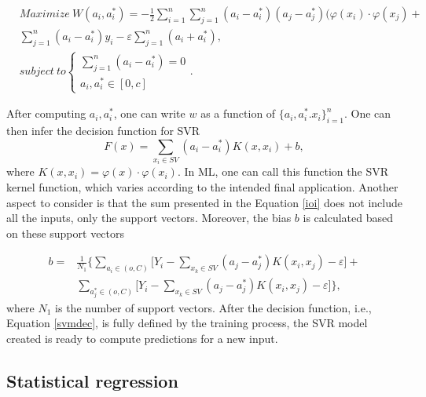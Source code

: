 \begin{equation}
\begin{split}
       & Maximize \  W(a_i, a_i^*) = -\frac{1}{2}\sum_{i=1}^{n}\sum_{j=1}^{n}(a_i-a_i^*)(a_j-a_j^*)(\varphi(x_i)\cdot \varphi(x_j) + \\
       & \sum_{j=1}^{n}(a_i-a_i^*)y_i - \varepsilon \sum_{j=1}^{n}(a_i+a_i^*),\\
       & subject \  to \begin{cases} \sum_{j=1}^{n}(a_i-a_i^*) = 0 \\ a_i, a_i^* \in [0,c] \end{cases} .
\end{split}
\end{equation}

After computing $a_i, a_i^*$, one can write $w$ as a function of $\{ a_i, a_i^*. x_i\}_{i=1}^n$. One can then infer the decision function for \ac{SVR}
\begin{equation}
      F(x) = \sum_{x_i \in SV} (a_i-a_i^*)K(x, x_i)+b , 
      \label{ioi}
\end{equation}
 where $K(x, x_i) = \varphi(x)\cdot\varphi(x_i)$. In \ac{ML}, one can call this function the \ac{SVR} kernel function, which varies according to the intended final application. Another aspect to consider is that the sum presented in the Equation \ref{ioi} does not include all the inputs, only the support vectors. Moreover, the bias $b$ is calculated based on these support vectors

\begin{equation}
\begin{split}
       b = & \frac{1}{N_1} \Bigg\{ \sum_{a_i \in (o,C)} \Bigg[ Y_i-\sum_{x_k\in SV}(a_j-a_j^*)K(x_i, x_j) - \varepsilon \Bigg] + \\
           & \sum_{a^*_j \in (o,C)}\Bigg[Y_i-\sum_{x_k\in SV}(a_j-a_j^*)K(x_i, x_j) - \varepsilon\Bigg] \Bigg\},
\end{split}
\end{equation}
 where $N_1$ is the number of support vectors. After the decision function, i.e., Equation \ref{svmdec}, is fully defined by the training process, the \ac{SVR} model created is ready to compute predictions for a new input\cite{review2017}.
 

\subsection{Statistical regression}

